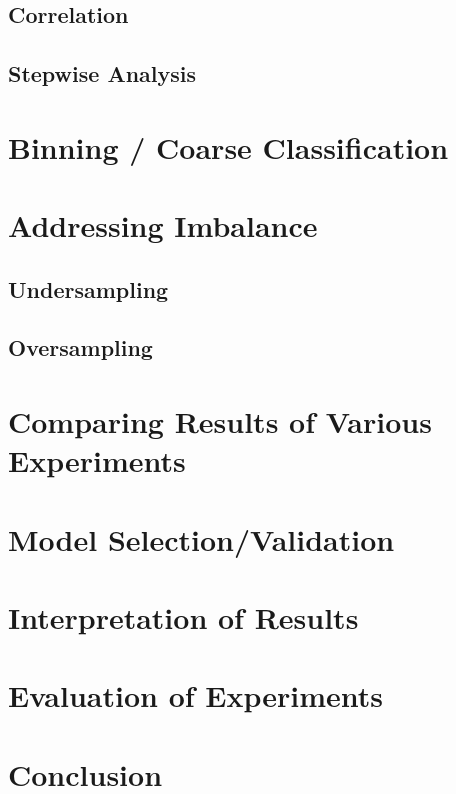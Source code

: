 \subsection{Correlation}
\subsection{Stepwise Analysis}

\section{Binning / Coarse Classification}

\section{Addressing Imbalance}
\subsection{Undersampling}
\subsection{Oversampling}

\section{Comparing Results of Various Experiments}

\section{Model Selection/Validation}

\section{Interpretation of Results}

\section{Evaluation of Experiments}

\section{Conclusion}